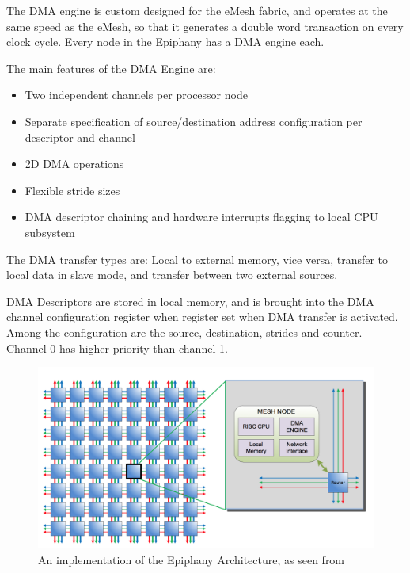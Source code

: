 The DMA engine is custom designed for the eMesh fabric, and operates at the same speed as the eMesh, so that  it generates a double word transaction on every clock cycle.
Every node in the Epiphany has a DMA engine each.

The main features of the DMA Engine are:  
\begin{itemize}
    \item Two independent channels per processor node
    \item Separate specification of source/destination address configuration per descriptor and channel
    \item 2D DMA operations
    \item Flexible stride sizes
    \item DMA descriptor chaining and hardware interrupts flagging to local CPU subsystem
\end{itemize}

The DMA transfer types are: Local to external memory, vice versa, transfer to local data in slave mode, and transfer between two external sources.

DMA Descriptors are stored in local memory, and is brought into the DMA channel configuration register when register set when DMA transfer is activated.
Among the configuration are the source, destination, strides and counter.
Channel 0 has higher priority than channel 1.

\begin{figure}[h!]
    \centering
    \includegraphics[width=1\textwidth]{Figures/DMA/AdaptevaEpiphany}
    \caption{An implementation of the Epiphany Architecture, as seen from \cite{epiphany}}
    \label{fig:AdaptevaEpiphany}
\end{figure}


